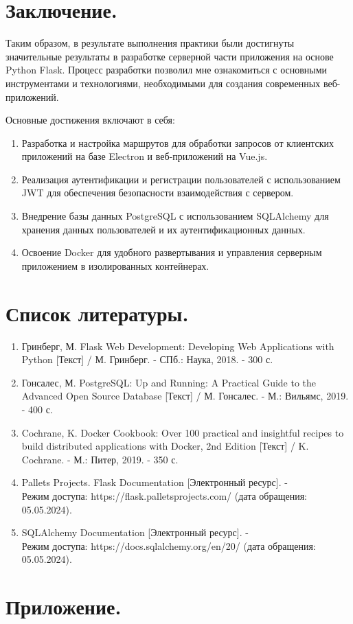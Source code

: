 \documentclass[12pt, russian]{extarticle}
\begin{document}
\begin{spacing}{1.5}
    \newpage
    \section{Заключение.}

    Таким образом, в результате выполнения практики были достигнуты значительные
    результаты в разработке серверной части приложения на основе Python Flask.
    Процесс разработки позволил мне ознакомиться с основными инструментами и технологиями,
    необходимыми для создания современных веб-приложений.

    Основные достижения включают в себя:

    \begin{enumerate}
        \item Разработка и настройка маршрутов для обработки запросов от клиентских приложений
            на базе Electron и веб-приложений на Vue.js.
        \item Реализация аутентификации и регистрации пользователей с использованием JWT
            для обеспечения безопасности взаимодействия с сервером.
        \item Внедрение базы данных PostgreSQL с использованием SQLAlchemy для хранения
            данных пользователей и их аутентификационных данных.
        \item Освоение Docker для удобного развертывания и управления серверным приложением
            в изолированных контейнерах.
    \end{enumerate}

    \newpage
    \section{Список литературы.}

    \begin{enumerate}
        \item Гринберг, М. Flask Web Development: Developing Web Applications with Python [Текст] / М. Гринберг. - СПб.: Наука, 2018. - 300 с.
        \item Гонсалес, М. PostgreSQL: Up and Running: A Practical Guide to the Advanced Open Source Database [Текст] / М. Гонсалес. - М.: Вильямс, 2019. - 400 с.
        \item Cochrane, K. Docker Cookbook: Over 100 practical and insightful recipes to build distributed applications with Docker, 2nd Edition [Текст] / K. Cochrane. - М.: Питер, 2019. - 350 с.
        \item Pallets Projects. Flask Documentation [Электронный ресурс]. - \\
            Режим доступа: https://flask.palletsprojects.com/ (дата обращения: 05.05.2024).
        \item SQLAlchemy Documentation [Электронный ресурс]. - \\
            Режим доступа: https://docs.sqlalchemy.org/en/20/ (дата обращения: 05.05.2024).
    \end{enumerate}

    \newpage
    \section{Приложение.}

    \end{spacing}
\end{document}
